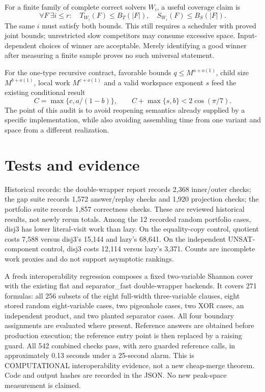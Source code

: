 \documentclass[11pt]{article}
\begin{document}
For a finite family of complete correct solvers $W_i$, a useful coverage claim is
\[
\forall F\ \exists i\le r:\quad
T_{W_i}(F)\le B_T(|F|),\quad S_{W_i}(F)\le B_S(|F|).
\]
The same $i$ must satisfy both bounds. This still requires a scheduler with
proved joint bounds; unrestricted slow competitors may consume excessive space.
Input-dependent choices of winner are acceptable. Merely identifying a good
winner after measuring a finite sample proves no such universal statement.

For the one-type recursive contract, favorable bounds
$q\le M^{a+o(1)}$, child size $M^{b+o(1)}$, local work $M^{c+o(1)}$ and a valid
workspace exponent $s$ feed the existing conditional result
\[
C=\max\{c,a/(1-b)\},\qquad
C+\max\{s,b\}<2\cos(\pi/7).
\]
The point of this audit is to avoid reopening semantics already supplied by a
specific implementation, while also avoiding assembling time from one variant
and space from a different realization.

\section*{Tests and evidence}
Historical records: the double-wrapper report records 2,368 inner/outer checks;
the gap suite records 1,572 answer/replay checks and 1,920 projection checks;
the portfolio suite records 1,857 correctness checks. These are reviewed historical
results, not newly rerun totals. Among the 12 recorded random portfolio cases,
disj3 has lower literal-visit work than lazy. On the equality-copy control,
quotient costs 7,588 versus disj3's 15,144 and lazy's 68,641. On the independent
UNSAT-component control, disj3 costs 12,114 versus lazy's 3,371. Counts are
incomplete work proxies and do not support asymptotic rankings.

A fresh interoperability regression composes a fixed two-variable Shannon
cover with the existing flat and separator\_fast double-wrapper backends.
It covers 271 formulas: all 256 subsets of the eight full-width three-variable
clauses, eight stored random eight-variable cases, two pigeonhole cases, two
XOR cases, an independent product, and two planted separator cases. All four
boundary assignments are evaluated where present. Reference answers are obtained
before production execution; the reference entry point is then replaced by a
raising guard. All 542 combined checks pass, with zero guarded reference calls,
in approximately 0.13 seconds under a 25-second alarm. This is COMPUTATIONAL
interoperability evidence, not a new cheap-merge theorem. Code and output hashes
are recorded in the JSON. No new peak-space measurement is claimed.
\end{document}
